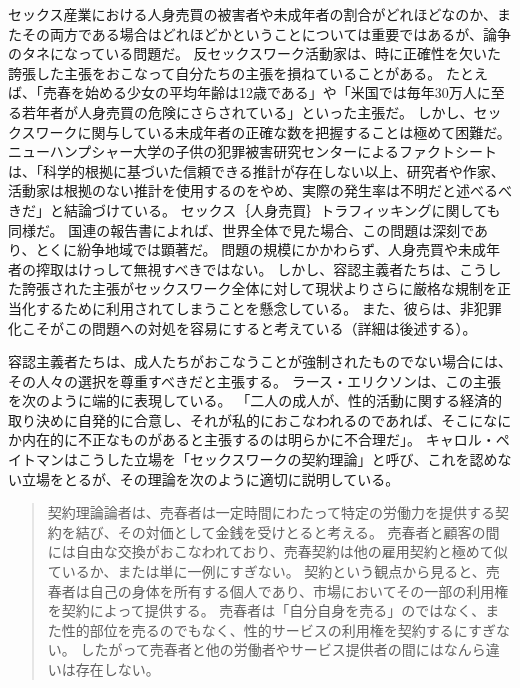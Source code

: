 \documentclass[paper=a4,book,openany]{jlreq}
\begin{document}
セックス産業における人身売買の被害者や未成年者の割合がどれほどなのか、またその両方である場合はどれほどかということについては重要ではあるが、論争のタネになっている問題だ。
反セックスワーク活動家は、時に正確性を欠いた誇張した主張をおこなって自分たちの主張を損ねていることがある。
たとえば、「売春を始める少女の平均年齢は12歳である」や「米国では毎年30万人に至る若年者が人身売買の危険にさらされている」といった主張だ\citep{hall14:_is_one_most_cited_statis}。
しかし、セックスワークに関与している未成年者の正確な数を把握することは極めて困難だ。
ニューハンプシャー大学の子供の犯罪被害研究センターによるファクトシートは、「科学的根拠に基づいた信頼できる推計が存在しない以上、研究者や作家、活動家は根拠のない推計を使用するのをやめ、実際の発生率は不明だと述べるべきだ」と結論づけている\citep{children08:_sex_traff_minor}。
セックス｛人身売買｝{トラフィッキング}に関しても同様だ。
国連の報告書によれば、世界全体で見た場合、この問題は深刻であり、とくに紛争地域では顕著だ\citep{drugs18:_global_repor_traff_person}。
問題の規模にかかわらず、人身売買や未成年者の搾取はけっして無視すべきではない。
しかし、容認主義者たちは、こうした誇張された主張がセックスワーク全体に対して現状よりさらに厳格な規制を正当化するために利用されてしまうことを懸念している。
また、彼らは、非犯罪化こそがこの問題への対処を容易にすると考えている（詳細は後述する）。

容認主義者たちは、成人たちがおこなうことが強制されたものでない場合には、その人々の選択を尊重すべきだと主張する。
ラース・エリクソンは、この主張を次のように端的に表現している。
「二人の成人が、性的活動に関する経済的取り決めに自発的に合意し、それが私的におこなわれるのであれば、そこになにか内在的に不正なものがあると主張するのは明らかに不合理だ」\citep[pp.338--339]{ericsson80:_charg_again_prost}。
キャロル・ペイトマンはこうした立場を「セックスワークの契約理論」と呼び、これを認めない立場をとるが、その理論を次のように適切に説明している。

\begin{quote}
契約理論論者は、売春者は一定時間にわたって特定の労働力を提供する契約を結び、その対価として金銭を受けとると考える。
売春者と顧客の間には自由な交換がおこなわれており、売春契約は他の雇用契約と極めて似ているか、または単に一例にすぎない。
契約という観点から見ると、売春者は自己の身体を所有する個人であり、市場においてその一部の利用権を契約によって提供する。
売春者は「自分自身を売る」のではなく、また性的部位を売るのでもなく、性的サービスの利用権を契約するにすぎない。
したがって売春者と他の労働者やサービス提供者の間にはなんら違いは存在しない。
\citep[p.191]{pateman88:_sexual_contr}
\end{quote}
\end{document}
